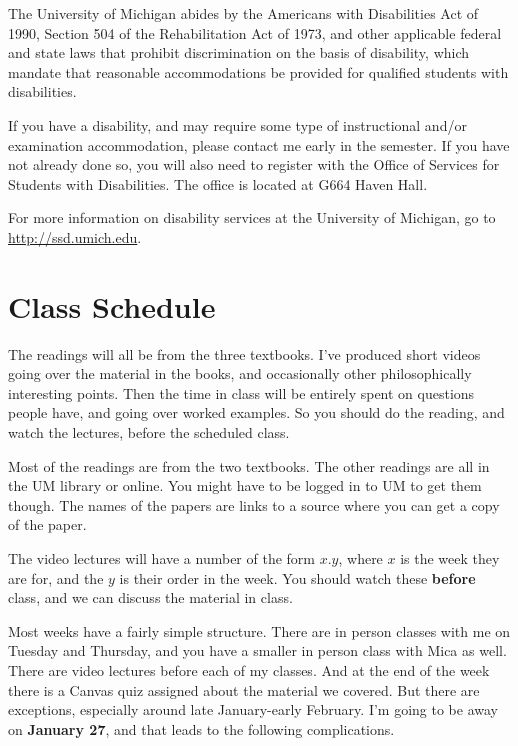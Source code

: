 \documentclass[
]{article}
\begin{document}
The University of Michigan abides by the Americans with Disabilities Act
of 1990, Section 504 of the Rehabilitation Act of 1973, and other
applicable federal and state laws that prohibit discrimination on the
basis of disability, which mandate that reasonable accommodations be
provided for qualified students with disabilities.

If you have a disability, and may require some type of instructional
and/or examination accommodation, please contact me early in the
semester. If you have not already done so, you will also need to
register with the Office of Services for Students with Disabilities. The
office is located at G664 Haven Hall.

For more information on disability services at the University of
Michigan, go to \url{http://ssd.umich.edu}.

\newpage

\hypertarget{class-schedule}{%
\section{Class Schedule}\label{class-schedule}}

The readings will all be from the three textbooks. I've produced short
videos going over the material in the books, and occasionally other
philosophically interesting points. Then the time in class will be
entirely spent on questions people have, and going over worked examples.
So you should do the reading, and watch the lectures, before the
scheduled class.

Most of the readings are from the two textbooks. The other readings are
all in the UM library or online. You might have to be logged in to UM to
get them though. The names of the papers are links to a source where you
can get a copy of the paper.

The video lectures will have a number of the form \(x.y\), where \(x\)
is the week they are for, and the \(y\) is their order in the week. You
should watch these \textbf{before} class, and we can discuss the
material in class.

Most weeks have a fairly simple structure. There are in person classes
with me on Tuesday and Thursday, and you have a smaller in person class
with Mica as well. There are video lectures before each of my classes.
And at the end of the week there is a Canvas quiz assigned about the
material we covered. But there are exceptions, especially around late
January-early February. I'm going to be away on \textbf{January 27}, and
that leads to the following complications.
\end{document}
